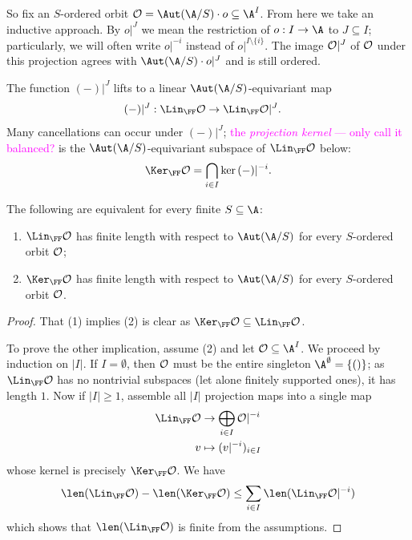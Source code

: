 So fix an $S$-ordered orbit $\cal O = \Aut(\A/S) \cdot o \subseteq \A^I$.
From here we take an inductive approach.
By $o |^J$ we mean the restriction of $o : I \to \A$ to $J \subseteq I$;
particularly, we will often write $o |^{-i}$ instead of $o |^{ I \setminus \{i\} }$.
The image $\cal O|^J$ of $\cal O$ under this projection agrees with $\Aut(\A/S) \cdot o |^J$ and is still ordered.

The function $(-)|^J$ lifts to a linear $\Aut(\A/S)$-equivariant map
\begin{align*}
    (-)|^J : \Lin_\FF \cal O &\to \Lin_\FF \cal O|^J.
\end{align*}
Many cancellations can occur under $(-)|^J$; 
\textcolor{magenta}{the \emph{projection kernel} --- only call it balanced?} is the $\Aut(\A/S)$-equivariant subspace of $\Lin_\FF \cal O$ below:
\[
    \Ker_\FF \cal O = \bigcap_{i \in I} \ker{ (-)|^{-i} }.
\]

\begin{claim}\label{claim:reduction-to-kernel}
    The following are equivalent for every finite $S \subseteq \A$:
    \begin{enumerate}
        \item $\Lin_\FF \cal O$ has finite length with respect to $\Aut(\A/S)$ for every $S$-ordered orbit $\cal O$;
        \item $\Ker_\FF \cal O$ has finite length with respect to $\Aut(\A/S)$ for every $S$-ordered orbit $\cal O$.
    \end{enumerate}
\end{claim}
\begin{proof}
    That (1) implies (2) is clear as $\Ker_\FF \cal O \subseteq \Lin_\FF \cal O$.
    
    To prove the other implication, assume (2) and let $\cal O \subseteq \A^I$.
    We proceed by induction on $|I|$.
    If $I = \emptyset$, then $\cal O$ must be the entire singleton $\A^\emptyset = \{ () \}$; 
    as $\Lin_\FF \cal O$ has no nontrivial subspaces (let alone finitely supported ones), it has length $1$.
    Now if $|I| \geq 1$, assemble all $|I|$ projection maps into a single map
    \begin{align*}
        \Lin_\FF \cal O &\to \bigoplus_{i \in I} \cal O|^{-i} \\
        v &\mapsto ( v|^{-i} )_{i \in I}
    \end{align*}
    whose kernel is precisely $\Ker_\FF \cal O$.
    We have
    \[
        \len( \Lin_\FF \cal O ) - \len( \Ker_\FF \cal O )
        \leq \sum_{i \in I} \len( \Lin_\FF \cal O|^{-i} )
    \]
    which shows that $\len( \Lin_\FF \cal O )$ is finite from the assumptions.
\end{proof}

